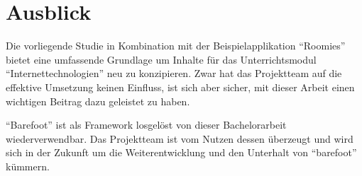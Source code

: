\section{Ausblick}

Die vorliegende Studie in Kombination mit der Beispielapplikation ``Roomies'' bietet eine umfassende Grundlage um Inhalte für das Unterrichtsmodul ``Internettechnologien'' neu zu konzipieren. Zwar hat das Projektteam auf die effektive Umsetzung keinen Einfluss, ist sich aber sicher, mit dieser Arbeit einen wichtigen Beitrag dazu geleistet zu haben.

``Barefoot'' ist als Framework losgelöst von dieser Bachelorarbeit wiederverwendbar. Das Projektteam ist vom Nutzen dessen überzeugt und wird sich in der Zukunft um die Weiterentwicklung und den Unterhalt von ``barefoot'' kümmern.